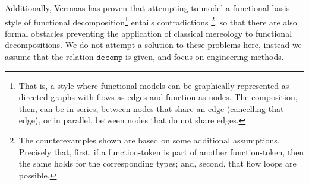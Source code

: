 \documentclass[sw]{iosart2x}
\newcommand{\generalStyle}[1]{\texttt{#1}}
\newcommand{\decom}{\generalStyle{decomp}}
\newcommand{\TODO}[1]{{\color{red} #1}}
\begin{document}
Additionally, Vermaas has proven that attempting to model a functional basis style of functional decomposition\footnote{That is, a style where functional models can be graphically represented as directed graphs with flows as edges and function as nodes. The composition, then, can be in series, between nodes that share an edge (cancelling that edge), or in parallel, between nodes that do not share edges.} entails contradictions \cite{vermaasFormalImpossibilityAnalysing2013}\footnote{The counterexamples shown are based on some additional assumptions. Precisely that, first, if a function-token is part of another function-token, then the same holds for the corresponding types; and, second, that flow loops are possible. %
}, so that there are also formal obstacles preventing the application of classical mereology to functional decompositions.
We do not attempt a solution to these problems here,
instead we assume that the relation $\decom$ is given, and focus on engineering methods. %
\end{document}

